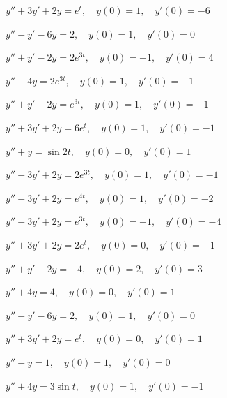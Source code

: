 \begin{exerciselist}
  \item\label{exer:8.3.1} $y''+3y'+2y=e^{t},\quad y(0)=1,\quad y'(0)=-6$

  \item\label{exer:8.3.2} $y''-y'-6y=2,\quad y(0)=1,\quad y'(0)=0$

  \item\label{exer:8.3.3} $y''+y'-2y=2e^{3t},\quad y(0)=-1,\quad y'(0)=4$

  \item\label{exer:8.3.4} $y''-4y=2e^{3t},\quad y(0)=1,\quad y'(0)=-1$

  \item\label{exer:8.3.5} $y''+y'-2y=e^{3t},\quad y(0)=1,\quad y'(0)=-1$

  \item\label{exer:8.3.6} $y''+3y'+2y=6e^{t},\quad y(0)=1,\quad y'(0)=-1$

  \item\label{exer:8.3.7} $y''+y=\sin2t,\quad y(0)=0,\quad y'(0)=1$

  \item\label{exer:8.3.8} $y''-3y'+2y=2e^{3t},\quad y(0)=1,\quad y'(0)=-1$

  \item\label{exer:8.3.9} $y''-3y'+2y=e^{4t},\quad y(0)=1,\quad y'(0)=-2$

  \item\label{exer:8.3.10} $y''-3y'+2y=e^{3t},\quad y(0)=-1,\quad y'(0)=-4$

  \item\label{exer:8.3.11} $y''+3y'+2y=2e^{t},\quad y(0)=0,\quad y'(0)=-1$

  \item\label{exer:8.3.12} $y''+y'-2y=-4,\quad y(0)=2,\quad y'(0)=3$

  \item\label{exer:8.3.13} $y''+4y=4,\quad y(0)=0,\quad y'(0)=1$

  \item\label{exer:8.3.14} $y''-y'-6y=2,\quad y(0)=1,\quad y'(0)=0$

  \item\label{exer:8.3.15} $y''+3y'+2y=e^{t},\quad y(0)=0,\quad y'(0)=1$

  \item\label{exer:8.3.16} $y''-y=1,\quad y(0)=1,\quad y'(0)=0$

  \item\label{exer:8.3.17} $y''+4y=3\sin t,\quad y(0)=1,\quad y'(0)=-1$


\end{exerciselist}
